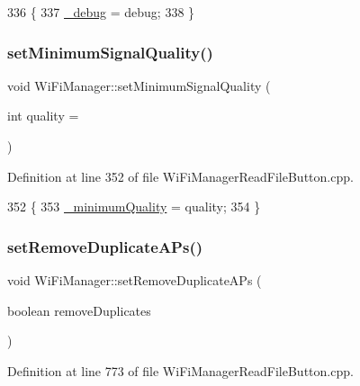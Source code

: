 \begin{DoxyCode}
336                                               \{
337   \hyperlink{class_wi_fi_manager_ac0f345f4a4c8bc38a49c8f87931b8cd4}{\_debug} = debug;
338 \}
\end{DoxyCode}
\mbox{\label{class_wi_fi_manager_a8cc211e7e004a44798d5b422a874f94b}} 
\subsubsection{\texorpdfstring{set\+Minimum\+Signal\+Quality()}{setMinimumSignalQuality()}}
{\footnotesize\ttfamily void Wi\+Fi\+Manager\+::set\+Minimum\+Signal\+Quality (\begin{DoxyParamCaption}\item[{int}]{quality = {} }\end{DoxyParamCaption})}



Definition at line 352 of file Wi\+Fi\+Manager\+Read\+File\+Button.\+cpp.


\begin{DoxyCode}
352                                                      \{
353   \hyperlink{class_wi_fi_manager_ad1e130a5ce502767de764ea0cb1cecf6}{\_minimumQuality} = quality;
354 \}
\end{DoxyCode}
\mbox{\label{class_wi_fi_manager_a4dd1dbf4f22900f226a3897b88155212}} 
\subsubsection{\texorpdfstring{set\+Remove\+Duplicate\+A\+Ps()}{setRemoveDuplicateAPs()}}
{\footnotesize\ttfamily void Wi\+Fi\+Manager\+::set\+Remove\+Duplicate\+A\+Ps (\begin{DoxyParamCaption}\item[{boolean}]{remove\+Duplicates }\end{DoxyParamCaption})}



Definition at line 773 of file Wi\+Fi\+Manager\+Read\+File\+Button.\+cpp.


